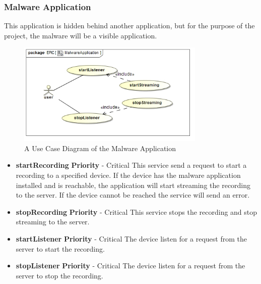 \documentclass[a4paper,12pt,titlepage]{article}
\begin{document}
\subsubsection{Malware Application}
	This application is hidden behind another application, but for the purpose of the project, the malware will be a visible application.
		\begin{figure}[h!]
 			 \centering
			  \includegraphics[width=0.8\textwidth]{MalwareApplicationUseCase}
		 	 \caption{A Use Case Diagram of the Malware Application}
		\end{figure}
		\begin{itemize}
			\item \textbf{startRecording}
				\newline\textbf{ Priority } - Critical
				\newline This service send a request to start a recording to a specified device. If the device has the malware application installed and is reachable, the application will start streaming the recording to the server. If the device cannot be reached the service will send an error.
			\item \textbf{stopRecording}
				\newline\textbf{ Priority } - Critical
				\newline This service stops the recording and stop streaming to the server.
			\item \textbf{startListener}
				\newline\textbf{ Priority } - Critical
				\newline The device listen for a request from the server to start the recording.
			\item \textbf{stopListener}
				\newline\textbf{ Priority } - Critical
				\newline The device listen for a request from the server to stop the recording.
		\end{itemize}
\end{document}
